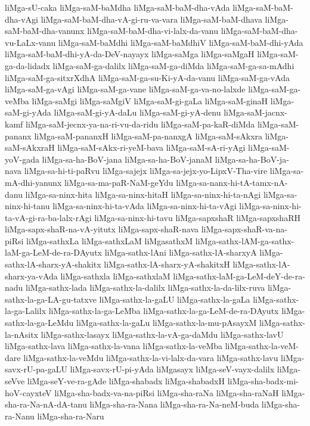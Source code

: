 {liMga-sU-caka
liMga-saM-baMdha
liMga-saM-baM-dha-vAda
liMga-saM-baM-dha-vAgi
liMga-saM-baM-dha-vA-gi-ru-va-vara
liMga-saM-baM-dhava
liMga-saM-baM-dha-vanunx
liMga-saM-baM-dha-vi-lalx-da-vanu
liMga-saM-baM-dha-vu-LaLx-vanu
liMga-saM-baMdhi
liMga-saM-baMdhiV
liMga-saM-baM-dhi-yAda
liMga-saM-baM-dhi-yA-da-DeV-nayayx
liMga-saMga
liMga-saMgaH
liMga-saM-ga-da-lidadx
liMga-saM-ga-dalilx
liMga-saM-ga-diMda
liMga-saM-ga-sa-mAdhi
liMga-saM-ga-sitxrXdhA
liMga-saM-ga-su-Ki-yA-da-vanu
liMga-saM-ga-vAda
liMga-saM-ga-vAgi
liMga-saM-ga-vane
liMga-saM-ga-va-no-lalxde
liMga-saM-ga-veMba
liMga-saMgi
liMga-saMgiV
liMga-saM-gi-gaLa
liMga-saM-ginaH
liMga-saM-gi-yAda
liMga-saM-gi-yA-daLu
liMga-saM-gi-yA-denu
liMga-saM-jacnx-kamf
liMga-saM-jecnx-ya-na-ri-vu-da-ridu
liMga-saM-pa-kaR-diMda
liMga-saM-pananx
liMga-saM-pananxH
liMga-saM-pa-nanxgA
liMga-saM-sAkxra
liMga-saM-sAkxraH
liMga-saM-sAkx-ri-yeM-bava
liMga-saM-sA-ri-yAgi
liMga-saM-yoV-gada
liMga-sa-ha-BoV-jana
liMga-sa-ha-BoV-janaM
liMga-sa-ha-BoV-ja-nava
liMga-sa-hi-ti-paRvu
liMga-sajejx
liMga-sa-jejx-yo-LipxV-Tha-vire
liMga-sa-mA-dhi-yanunx
liMga-sa-ma-paR-NaM-geYdu
liMga-sa-nanx-hi-tA-tamx-nA-danu
liMga-sa-ninx-hita
liMga-sa-ninx-hitaH
liMga-sa-ninx-hi-ta-nAgi
liMga-sa-ninx-hi-tanu
liMga-sa-ninx-hi-ta-vAda
liMga-sa-ninx-hi-ta-vAgi
liMga-sa-ninx-hi-ta-vA-gi-ra-ba-lalx-rAgi
liMga-sa-ninx-hi-tavu
liMga-sapxshaR
liMga-sapxshaRH
liMga-sapx-shaR-na-vA-yitutx
liMga-sapx-shaR-nava
liMga-sapx-shaR-va-na-piRsi
liMga-sathxLa
liMga-sathxLaM
liMgasathxM
liMga-sathx-lAM-ga-sathx-laM-ga-LeM-de-ra-DAyutx
liMga-sathx-lAni
liMga-sathx-lA-sharxyA
liMga-sathx-lA-sharx-yA-shakitx
liMga-sathx-lA-sharx-yA-shakitxH
liMga-sathx-lA-sharx-ya-vAda
liMga-sathxla
liMga-sathxlaM
liMga-sathx-laM-ga-LeM-deY-de-ra-nadu
liMga-sathx-lada
liMga-sathx-la-dalilx
liMga-sathx-la-da-lilx-ruva
liMga-sathx-la-ga-LA-gu-tatxve
liMga-sathx-la-gaLU
liMga-sathx-la-gaLa
liMga-sathx-la-ga-Lalilx
liMga-sathx-la-ga-LeMba
liMga-sathx-la-ga-LeM-de-ra-DAyutx
liMga-sathx-la-ga-LeMdu
liMga-sathx-la-gaLu
liMga-sathx-la-mu-pAsayxM
liMga-sathx-la-nAsitx
liMga-sathx-lasayx
liMga-sathx-la-vA-ga-daMdu
liMga-sathx-lavU
liMga-sathx-lava
liMga-sathx-la-vana
liMga-sathx-la-veMba
liMga-sathx-la-veM-dare
liMga-sathx-la-veMdu
liMga-sathx-la-vi-lalx-da-vara
liMga-sathx-lavu
liMga-savx-rU-pa-gaLU
liMga-savx-rU-pi-yAda
liMgasayx
liMga-seV-vayx-dalilx
liMga-seVve
liMga-seY-ve-ra-gAde
liMga-shabadx
liMga-shabadxH
liMga-sha-badx-mi-hoV-cayxteV
liMga-sha-badx-va-na-piRsi
liMga-sha-raNa
liMga-sha-raNaH
liMga-sha-ra-Na-nA-dA-tanu
liMga-sha-ra-Nana
liMga-sha-ra-Na-neM-buda
liMga-sha-ra-Nanu
liMga-sha-ra-Naru
}
